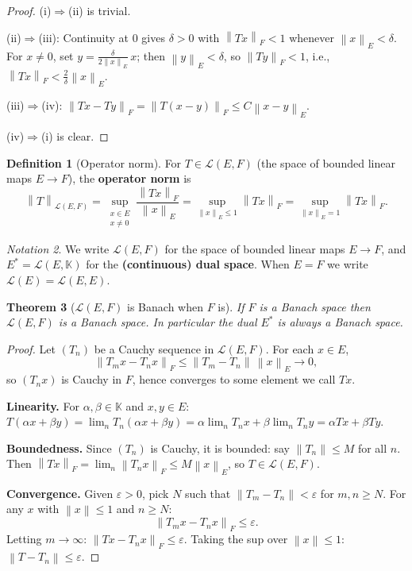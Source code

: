 \documentclass[a4paper,12pt]{book}
\newcommand{\K}{\mathbb{K}}
\newcommand{\norm}[1]{\left\| #1 \right\|}
\theoremstyle{definition}
\newtheorem{definition}{Definition}[chapter]
\theoremstyle{plain}
\newtheorem{theorem}[definition]{Theorem}
\theoremstyle{remark}
\newtheorem{notation}[definition]{Notation}
\begin{document}
\begin{proof}
(i)$\Rightarrow$(ii) is trivial.

(ii)$\Rightarrow$(iii):  Continuity at $0$ gives $\delta>0$ with
$\norm{Tx}_F<1$ whenever $\norm{x}_E<\delta$.  For $x\ne 0$, set
$y = \frac{\delta}{2\norm{x}_E}\,x$; then $\norm{y}_E<\delta$, so
$\norm{Ty}_F<1$, i.e., $\norm{Tx}_F < \frac{2}{\delta}\norm{x}_E$.

(iii)$\Rightarrow$(iv):
$\norm{Tx-Ty}_F = \norm{T(x-y)}_F \le C\norm{x-y}_E$.

(iv)$\Rightarrow$(i) is clear.
\end{proof}

\begin{definition}[Operator norm]
\label{def:operator-norm}
For $T\in\mathcal{L}(E,F)$ (the space of bounded linear maps $E\to F$), the
\textbf{operator norm} is
\[
  \norm{T}_{\mathcal{L}(E,F)}
  = \sup_{\substack{x\in E\\ x\ne 0}} \frac{\norm{Tx}_F}{\norm{x}_E}
  = \sup_{\norm{x}_E\le 1}\norm{Tx}_F
  = \sup_{\norm{x}_E= 1}\norm{Tx}_F.
\]
\end{definition}

\begin{notation}
We write $\mathcal{L}(E,F)$ for the space
of bounded linear maps $E\to F$, and $E^* = \mathcal{L}(E,\K)$ for the
\textbf{(continuous) dual space}.
When $E=F$ we write $\mathcal{L}(E)=\mathcal{L}(E,E)$.
\end{notation}

\begin{theorem}[$\mathcal{L}(E,F)$ is Banach when $F$ is]
\label{thm:LEF-banach}
If $F$ is a Banach space then $\mathcal{L}(E,F)$ is a Banach space.
In particular the dual $E^*$ is always a Banach space.
\end{theorem}

\begin{proof}
Let $(T_n)$ be a Cauchy sequence in $\mathcal{L}(E,F)$.  For each $x\in E$,
\[
  \norm{T_m x - T_n x}_F \le \norm{T_m-T_n}\,\norm{x}_E \to 0,
\]
so $(T_n x)$ is Cauchy in $F$, hence converges to some element we call $Tx$.

\textbf{Linearity.}  For $\alpha,\beta\in\K$ and $x,y\in E$:
$T(\alpha x+\beta y) = \lim_n T_n(\alpha x+\beta y)
= \alpha\lim_n T_n x + \beta\lim_n T_n y = \alpha Tx+\beta Ty$.

\textbf{Boundedness.}  Since $(T_n)$ is Cauchy, it is bounded: say
$\norm{T_n}\le M$ for all $n$.  Then
$\norm{Tx}_F = \lim_n\norm{T_n x}_F \le M\norm{x}_E$, so
$T\in\mathcal{L}(E,F)$.

\textbf{Convergence.}  Given $\varepsilon>0$, pick $N$ such that
$\norm{T_m-T_n}<\varepsilon$ for $m,n\ge N$.  For any $x$ with
$\norm{x}\le 1$ and $n\ge N$:
\[
  \norm{T_m x - T_n x}_F \le \varepsilon.
\]
Letting $m\to\infty$: $\norm{Tx-T_n x}_F\le\varepsilon$.  Taking the sup
over $\norm{x}\le 1$: $\norm{T-T_n}\le\varepsilon$.
\end{proof}
\end{document}
